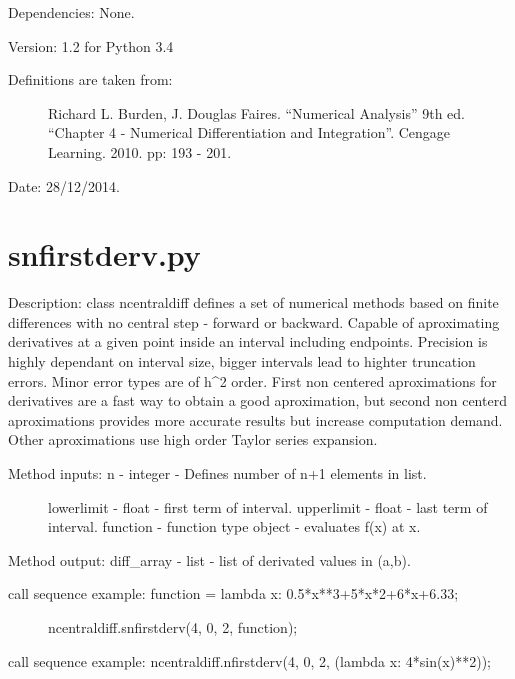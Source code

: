 \documentclass[letterpaper,10pt,oneside]{sphinxmanual}
\theoremstyle{plain}%
\theoremstyle{definition}%
\theoremstyle{remark}%
\begin{document}
Dependencies: None.

Version: 1.2 for Python 3.4
\begin{description}
\item[{Definitions are taken from:}] \leavevmode
Richard L. Burden, J. Douglas Faires. ``Numerical Analysis'' 9th ed.
``Chapter 4 - Numerical Differentiation and Integration''. 
Cengage Learning. 2010. pp: 193 - 201.

\end{description}




Date: 28/12/2014.


\section{snfirstderv.py}
\label{code:snfirstderv-py}\label{code:module-snfirstderv}
Description: class ncentraldiff defines a set of numerical methods based on
finite differences with no central step - forward or backward. Capable of
aproximating derivatives at a given point inside an interval including 
endpoints. Precision is highly dependant on interval size, bigger intervals
lead to highter truncation errors. Minor error types are of h\textasciicircum{}2 order. First
non centered aproximations for derivatives are a fast way to obtain a good
aproximation, but second non centerd aproximations provides more accurate
results but increase computation demand. Other aproximations use high order
Taylor series expansion.
\begin{description}
\item[{Method inputs: n - integer - Defines number of n+1 elements in list.}] \leavevmode
lowerlimit - float - first term of interval.
upperlimit - float - last term of interval.
function - function type object - evaluates f(x) at x.

\end{description}

Method output: diff\_array - list - list of derivated values in (a,b).
\begin{description}
\item[{call sequence example: function = lambda x: 0.5*x**3+5*x*2+6*x+6.33;}] \leavevmode
ncentraldiff.snfirstderv(4, 0, 2, function);

\end{description}

call sequence example: ncentraldiff.nfirstderv(4, 0, 2, (lambda x: 4*sin(x)**2));
\end{document}
